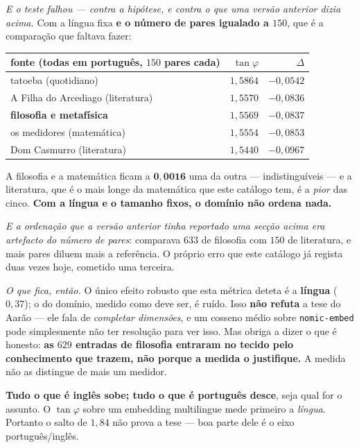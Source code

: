 \documentclass[11pt]{article}
\newcommand{\code}[1]{\texttt{\small #1}}
\theoremstyle{plain}
\theoremstyle{remark}
\begin{document}
\begin{itemize}
\emph{E o teste falhou --- contra a hipótese, e contra o que uma versão anterior dizia acima.} Com a língua
fixa \textbf{e o número de pares igualado a $150$}, que é a comparação que faltava fazer:

\begin{center}\small
\begin{tabular}{lrr}
\hline
fonte (todas em português, $150$ pares cada) & $\tan\varphi$ & $\Delta$ \\ \hline
tatoeba (quotidiano) & $1{,}5864$ & $-0{,}0542$ \\
A Filha do Arcediago (literatura) & $1{,}5570$ & $-0{,}0836$ \\
\textbf{filosofia e metafísica} & $1{,}5569$ & $-0{,}0837$ \\
os medidores (matemática) & $1{,}5554$ & $-0{,}0853$ \\
Dom Casmurro (literatura) & $1{,}5440$ & $-0{,}0967$ \\
\hline
\end{tabular}
\end{center}

\noindent A filosofia e a matemática ficam a $\mathbf{0{,}0016}$ uma da outra --- indistinguíveis
--- e a literatura, que é o mais longe da matemática que este catálogo tem, é a \emph{pior} das
cinco. \textbf{Com a língua e o tamanho fixos, o domínio não ordena nada.}

\emph{E a ordenação que a versão anterior tinha reportado uma secção acima era artefacto do número de pares}: 
comparava $633$ de filosofia com $150$ de literatura, e mais pares diluem mais a referência. O
próprio erro que este catálogo já regista duas vezes hoje, cometido uma terceira.

\emph{O que fica, então.} O único efeito robusto que esta métrica deteta é a \textbf{língua}
($0{,}37$); o do domínio, medido como deve ser, é ruído. Isso \textbf{não refuta} a tese do Aarão
--- ele fala de \emph{completar dimensões}, e um cosseno médio sobre \code{nomic-embed} pode
simplesmente não ter resolução para ver isso. Mas obriga a dizer o que é honesto: \textbf{as $629$
entradas de filosofia entraram no tecido pelo conhecimento que trazem, não porque a medida o
justifique.} A medida não as distingue de mais um medidor.

\noindent \textbf{Tudo o que é inglês sobe; tudo o que é português desce}, seja qual for o
assunto. O $\tan\varphi$ sobre um embedding multilingue mede primeiro a \emph{língua}. Portanto o
salto de $1{,}84$ não prova a tese --- boa parte dele é o eixo português/inglês.


\end{itemize}
\end{document}
